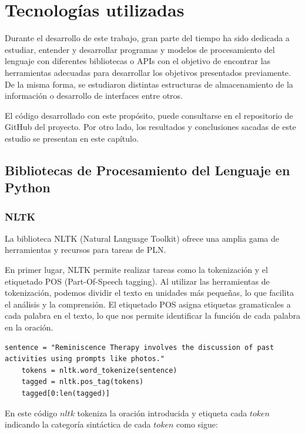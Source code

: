 \chapter{Tecnologías utilizadas}
\label{cap:Estudio teórico}
Durante el desarrollo de este trabajo, gran parte del tiempo ha sido dedicada a estudiar, entender y desarrollar programas y modelos de procesamiento del lenguaje con diferentes bibliotecas o APIs con el objetivo de encontrar las herramientas adecuadas para desarrollar los objetivos presentados previamente. De la misma forma, se estudiaron distintas estructuras de almacenamiento de la información o desarrollo de interfaces entre otros. 

El código desarrollado con este propósito, puede consultarse en el repositorio de GitHub del proyecto. Por otro lado, los resultados y conclusiones sacadas de este estudio se presentan en este capítulo.  

\section{Bibliotecas de Procesamiento del Lenguaje en Python}

\subsection{NLTK}
La biblioteca NLTK (Natural Language Toolkit) ofrece una amplia gama de herramientas y recursos para tareas de PLN.

En primer lugar, NLTK permite realizar tareas como la tokenización y el  etiquetado POS (Part-Of-Speech tagging). Al utilizar las herramientas de tokenización, podemos dividir el texto en unidades más pequeñas, lo que facilita el análisis y la comprensión. El etiquetado POS asigna etiquetas gramaticales a cada palabra en el texto, lo que nos permite identificar la función de cada palabra en la oración. 

\begin{lstlisting}[style=SpyderStyle, caption={Ejemplo de código en Python}, captionpos=b, label={lst:python},breaklines = true]
	sentence = "Reminiscence Therapy involves the discussion of past activities using prompts like photos."
	tokens = nltk.word_tokenize(sentence)
	tagged = nltk.pos_tag(tokens)
	tagged[0:len(tagged)]
\end{lstlisting}

En este código $nltk$ tokeniza la oración introducida y etiqueta cada $token$ indicando la categoría sintáctica de cada $token$ como sigue:

